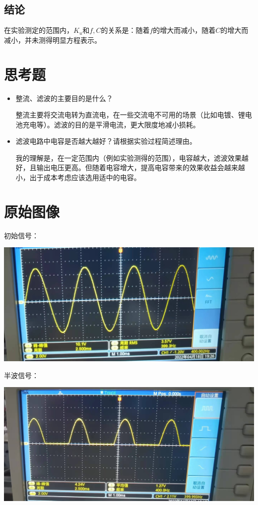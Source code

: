 \documentclass[a4paper]{ltxdoc}
\newenvironment{Figure}
{\par\medskip\noindent\minipage{\linewidth}}
{\endminipage\par\medskip}
\begin{document}
\begin{multicols}{2}
    \subsection{结论}

    在实验测定的范围内，$K_u$和$f,C$的关系是：随着$f$的增大而减小，随着$C$的增大而减小，并未测得明显方程表示。

    \section{思考题}
    \begin{itemize}
        \item 整流、滤波的主要目的是什么？

              整流主要将交流电转为直流电，在一些交流电不可用的场景（比如电镀、锂电池充电等）。滤波的目的是平滑电流，更大限度地减小损耗。

        \item 滤波电路中电容是否越大越好？请根据实验过程简述理由。

              我的理解是，在一定范围内（例如实验测得的范围），电容越大，滤波效果越好，且输出电压更高。但随着电容增大，提高电容带来的效果收益会越来越小，出于成本考虑应该选用适中的电容。
    \end{itemize}
    \section{原始图像}

    初始信号：
    \begin{Figure}
        \centering
        \includegraphics[width=0.7\linewidth]{img/original/22.jpg}
    \end{Figure}

    半波信号：
    \begin{Figure}
        \centering
        \includegraphics[width=0.7\linewidth]{img/original/1.jpg}
    \end{Figure}


\end{multicols}
\end{document}
